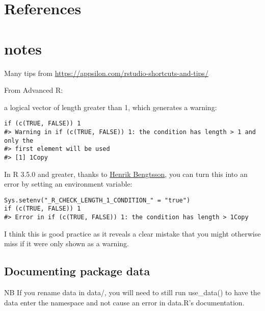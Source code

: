 \documentclass[
  letterpaper,
  DIV=11,
  numbers=noendperiod,
  oneside]{scrreprt}
\newlength{\cslhangindent}
\newlength{\cslentryspacingunit} %
\newenvironment{CSLReferences}[2] %
 {%
  \setlength{\parindent}{0pt}
  \ifodd #1
  \let\oldpar\par
  \def\par{\hangindent=\cslhangindent\oldpar}
  \fi
  \setlength{\parskip}{#2\cslentryspacingunit}
 }%
 {}
\begin{document}

\hypertarget{references}{%
\chapter*{References}\label{references}}

\hypertarget{refs}{}
\begin{CSLReferences}{0}{0}
\end{CSLReferences}

\appendix
{}

\hypertarget{notes}{%
\chapter{notes}\label{notes}}

Many tips from \url{https://appsilon.com/rstudio-shortcuts-and-tips/}

From Advanced R:

a logical vector of length greater than 1, which generates a warning:

\begin{verbatim}
if (c(TRUE, FALSE)) 1
#> Warning in if (c(TRUE, FALSE)) 1: the condition has length > 1 and only the
#> first element will be used
#> [1] 1Copy
\end{verbatim}

In R 3.5.0 and greater, thanks to
\href{https://github.com/HenrikBengtsson/Wishlist-for-R/issues/38}{Henrik
Bengtsson}, you can turn this into an error by setting an environment
variable:

\begin{verbatim}
Sys.setenv("_R_CHECK_LENGTH_1_CONDITION_" = "true")
if (c(TRUE, FALSE)) 1
#> Error in if (c(TRUE, FALSE)) 1: the condition has length > 1Copy
\end{verbatim}

I think this is good practice as it reveals a clear mistake that you
might otherwise miss if it were only shown as a warning.

\hypertarget{documenting-package-data}{%
\section{Documenting package data}\label{documenting-package-data}}

NB If you rename data in data/, you will need to still run use\_data()
to have the data enter the namespace and not cause an error in data.R's
documentation.
\end{document}
